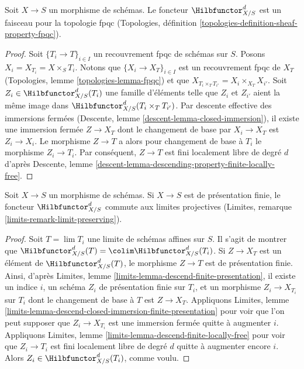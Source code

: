 \begin{lemma}
\label{lemma-hilb-d-sheaf}
Soit $X \to S$ un morphisme de schémas. Le foncteur $\Hilbfunctor^d_{X/S}$
est un faisceau pour la topologie fpqc
(Topologies, définition \ref{topologies-definition-sheaf-property-fpqc}).
\end{lemma}

\begin{proof}
Soit $\{T_i \to T\}_{i \in I}$ un recouvrement fpqc de schémas sur $S$.
Posons $X_i = X_{T_i} = X \times_S T_i$.
Notons que $\{X_i \to X_T\}_{i \in I}$ est un recouvrement fpqc de
$X_T$ (Topologies, lemme \ref{topologies-lemma-fpqc})
et que $X_{T_i \times_T T_{i'}} = X_i \times_{X_T} X_{i'}$.
Soit $Z_i \in \Hilbfunctor^d_{X/S}(T_i)$ une famille
d'éléments telle que $Z_i$ et $Z_{i'}$ aient la même image dans
$\Hilbfunctor^d_{X/S}(T_i \times_T T_{i'})$. Par descente effective
des immersions fermées (Descente, lemme \ref{descent-lemma-closed-immersion}),
il existe une immersion fermée $Z \to X_T$ dont le changement de base par
$X_i \to X_T$ est $Z_i \to X_i$. Le morphisme $Z \to T$
a alors pour changement de base à $T_i$ le morphisme
$Z_i \to T_i$. Par conséquent, $Z \to T$ est fini localement libre de degré $d$
d'après Descente, lemme \ref{descent-lemma-descending-property-finite-locally-free}.
\end{proof}

\begin{lemma}
\label{lemma-hilb-d-limit-preserving}
Soit $X \to S$ un morphisme de schémas. Si $X \to S$ est
de présentation finie, le foncteur $\Hilbfunctor^d_{X/S}$
commute aux limites projectives (Limites, remarque \ref{limits-remark-limit-preserving}).
\end{lemma}

\begin{proof}
Soit $T = \lim T_i$ une limite de schémas affines sur $S$. Il s'agit de montrer
que $\Hilbfunctor^d_{X/S}(T) = \colim \Hilbfunctor^d_{X/S}(T_i)$.
Si $Z \to X_T$ est un élément de $\Hilbfunctor^d_{X/S}(T)$,
le morphisme $Z \to T$ est de présentation finie. Ainsi, d'après
Limites, lemme \ref{limits-lemma-descend-finite-presentation},
il existe un indice $i$, un schéma $Z_i$ de présentation finie sur $T_i$,
et un morphisme $Z_i \to X_{T_i}$ sur $T_i$ dont le changement de base à $T$
est $Z \to X_T$. Appliquons Limites, lemme
\ref{limits-lemma-descend-closed-immersion-finite-presentation}
pour voir que l'on peut supposer que $Z_i \to X_{T_i}$ est une immersion fermée
quitte à augmenter $i$.
Appliquons Limites, lemme \ref{limits-lemma-descend-finite-locally-free}
pour voir que $Z_i \to T_i$ est fini localement libre de degré $d$
quitte à augmenter encore $i$.
Alors $Z_i \in \Hilbfunctor^d_{X/S}(T_i)$, comme voulu.
\end{proof}

